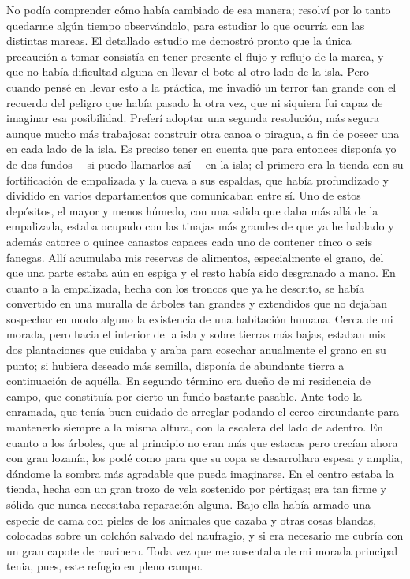 \documentclass{novela}
\begin{document}
    No podía comprender cómo había cambiado de esa manera; resolví por lo tanto quedarme algún tiempo observándolo, para estudiar lo que ocurría con las distintas mareas.
    El detallado estudio me demostró pronto que la única precaución a tomar consistía en tener presente el flujo y reflujo de la marea, y que no había dificultad alguna en llevar el bote al otro lado de la isla. Pero cuando pensé en llevar esto a la práctica, me invadió un terror tan grande con el recuerdo del peligro que había pasado la otra vez, que ni siquiera fui capaz de imaginar esa posibilidad. Preferí adoptar una segunda resolución, más segura aunque mucho más trabajosa: construir otra canoa o piragua, a fin de poseer una en cada lado de la isla.
    Es preciso tener en cuenta que para entonces disponía yo de dos fundos —si puedo llamarlos así— en la isla; el primero era la tienda con su fortificación de empalizada y la cueva a sus espaldas, que había profundizado y dividido en varios departamentos que comunicaban entre sí. Uno de estos depósitos, el mayor y menos húmedo, con una salida que daba más allá de la empalizada, estaba ocupado con las tinajas más grandes de que ya he hablado y además catorce o quince canastos capaces cada uno de contener cinco o seis fanegas. Allí acumulaba mis reservas de alimentos, especialmente el grano, del que una parte estaba aún en espiga y el resto había sido desgranado a mano.
    En cuanto a la empalizada, hecha con los troncos que ya he descrito, se había convertido en una muralla de árboles tan grandes y extendidos que no dejaban sospechar en modo alguno la existencia de una habitación humana.
    Cerca de mi morada, pero hacia el interior de la isla y sobre tierras más bajas, estaban mis dos plantaciones que cuidaba y araba para cosechar anualmente el grano en su punto; si hubiera deseado más semilla, disponía de abundante tierra a continuación de aquélla.
    En segundo término era dueño de mi residencia de campo, que constituía por cierto un fundo bastante pasable. Ante todo la enramada, que tenía buen cuidado de arreglar podando el cerco circundante para mantenerlo siempre a la misma altura, con la escalera del lado de adentro. En cuanto a los árboles, que al principio no eran más que estacas pero crecían ahora con gran lozanía, los podé como para que su copa se desarrollara espesa y amplia, dándome la sombra más agradable que pueda imaginarse. En el centro estaba la tienda, hecha con un gran trozo de vela sostenido por pértigas; era tan firme y sólida que nunca necesitaba reparación alguna. Bajo ella había armado una especie de cama con pieles de los animales que cazaba y otras cosas blandas, colocadas sobre un colchón salvado del naufragio, y si era necesario me cubría con un gran capote de marinero. Toda vez que me ausentaba de mi morada principal tenia, pues, este refugio en pleno campo.
\end{document}
